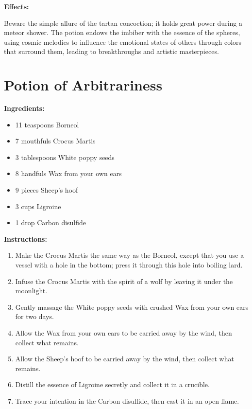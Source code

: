 \documentclass{article}
\begin{document}
\textbf{Effects:}

Beware the simple allure of the tartan concoction; it holds great power during a meteor shower. The potion endows the imbiber with the essence of the spheres, using cosmic melodies to influence the emotional states of others through colors that surround them, leading to breakthroughs and artistic masterpieces.

\newpage
\section*{Potion of Arbitrariness}

\textbf{Ingredients:}

\begin{itemize}
  \item 11 teaspoons Borneol
  \item 7 mouthfuls Crocus Martis
  \item 3 tablespoons White poppy seeds
  \item 8 handfuls Wax from your own ears
  \item 9 pieces Sheep's hoof
  \item 3 cups Ligroine
  \item 1 drop Carbon disulfide
\end{itemize}

\textbf{Instructions:}

\begin{enumerate}
  \item Make the Crocus Martis the same way as the Borneol, except that you use a vessel with a hole in the bottom; press it through this hole into boiling lard.
  \item Infuse the Crocus Martis with the spirit of a wolf by leaving it under the moonlight.
  \item Gently massage the White poppy seeds with crushed Wax from your own ears for two days.
  \item Allow the Wax from your own ears to be carried away by the wind, then collect what remains.
  \item Allow the Sheep's hoof to be carried away by the wind, then collect what remains.
  \item Distill the essence of Ligroine secretly and collect it in a crucible.
  \item Trace your intention in the Carbon disulfide, then cast it in an open flame.
\end{enumerate}
\end{document}
